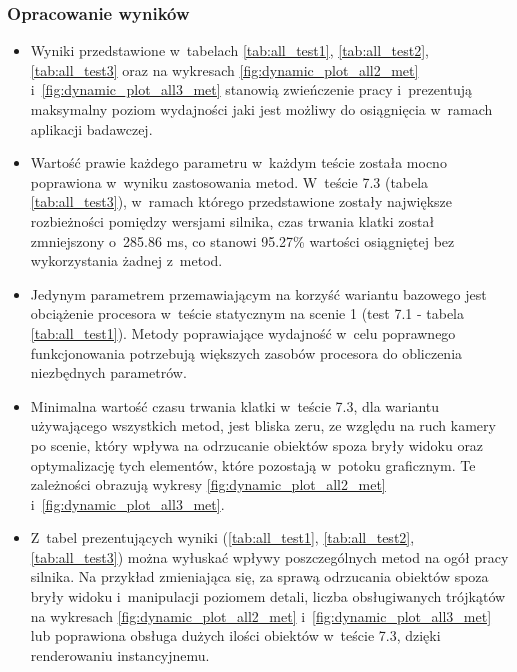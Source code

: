 \documentclass[a4paper,twoside,12pt]{book}
\begin{document}
\vbox{}


\subsubsection{Opracowanie wyników}
\begin{itemize}
    \item Wyniki przedstawione w~tabelach \ref{tab:all_test1}, \ref{tab:all_test2}, \ref{tab:all_test3} oraz na wykresach \ref{fig:dynamic_plot_all2_met} i~\ref{fig:dynamic_plot_all3_met} stanowią zwieńczenie pracy i~prezentują maksymalny poziom wydajności jaki jest możliwy do osiągnięcia w~ramach aplikacji badawczej.
    \item Wartość prawie każdego parametru w~każdym teście została mocno poprawiona w~wyniku zastosowania metod. W~teście 7.3 (tabela \ref{tab:all_test3}), w~ramach którego przedstawione zostały największe rozbieżności pomiędzy wersjami silnika, czas trwania klatki został zmniejszony o~285.86 ms, co stanowi 95.27\% wartości osiągniętej bez wykorzystania żadnej z~metod.
    \item Jedynym parametrem przemawiającym na korzyść wariantu bazowego jest obciążenie procesora w~teście statycznym na scenie 1 (test 7.1 - tabela \ref{tab:all_test1}). Metody poprawiające wydajność w~celu poprawnego funkcjonowania potrzebują większych zasobów procesora do obliczenia niezbędnych parametrów.
    \item Minimalna wartość czasu trwania klatki w~teście 7.3, dla wariantu używającego wszystkich metod, jest bliska zeru, ze względu na ruch kamery po scenie, który wpływa na odrzucanie obiektów spoza bryły widoku oraz optymalizację tych elementów, które pozostają w~potoku graficznym. Te zależności obrazują wykresy \ref{fig:dynamic_plot_all2_met} i~\ref{fig:dynamic_plot_all3_met}.
    \item Z~tabel prezentujących wyniki (\ref{tab:all_test1}, \ref{tab:all_test2}, \ref{tab:all_test3}) można wyłuskać wpływy poszczególnych metod na ogół pracy silnika. Na przykład zmieniająca się, za sprawą odrzucania obiektów spoza bryły widoku i~manipulacji poziomem detali, liczba obsługiwanych trójkątów na wykresach \ref{fig:dynamic_plot_all2_met} i~\ref{fig:dynamic_plot_all3_met} lub poprawiona obsługa dużych ilości obiektów w~teście 7.3, dzięki renderowaniu instancyjnemu.
\end{itemize}

\newpage
\end{document}

